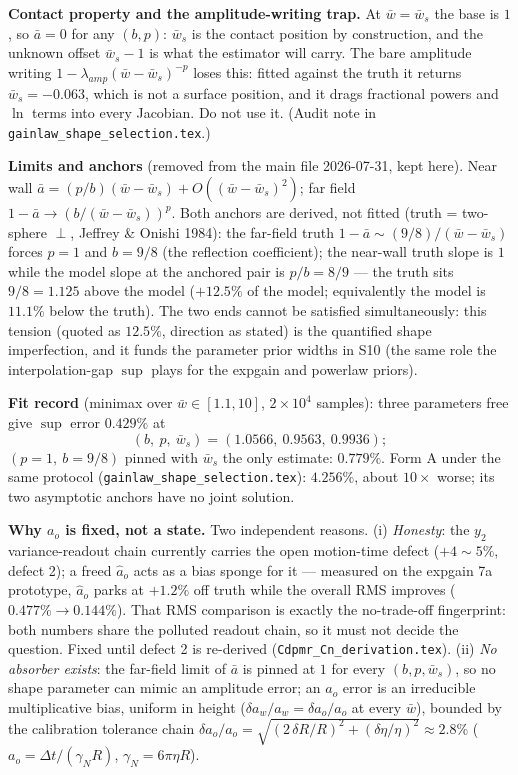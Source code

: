 \documentclass[11pt,a4paper,fontset=none]{ctexart}
\begin{document}
\textbf{Contact property and the amplitude-writing trap.}  At
$\bar{w}=\bar{w}_s$ the base is $1$, so $\bar{a}=0$ for any $(b,p)$:
$\bar{w}_s$ is the contact position by construction, and the unknown offset
$\bar{w}_s-1$ is what the estimator will carry.  The bare amplitude writing
$1-\lambda_{amp}(\bar{w}-\bar{w}_s)^{-p}$ loses this: fitted against the
truth it returns $\bar{w}_s=-0.063$, which is not a surface position, and it
drags fractional powers and $\ln$ terms into every Jacobian.  Do not use it.
(Audit note in \texttt{gainlaw\_shape\_selection.tex}.)

\textbf{Limits and anchors} (removed from the main file 2026-07-31, kept
here).  Near wall $\bar{a} = (p/b)(\bar{w}-\bar{w}_s) +
O((\bar{w}-\bar{w}_s)^2)$; far field $1-\bar{a} \to
(b/(\bar{w}-\bar{w}_s))^{p}$.  Both anchors are derived, not fitted
(truth = two-sphere $\perp$, Jeffrey \& Onishi 1984): the far-field truth
$1-\bar{a}\sim(9/8)/(\bar{w}-\bar{w}_s)$ forces $p=1$ and $b=9/8$ (the
reflection coefficient); the near-wall truth slope is $1$ while the model
slope at the anchored pair is $p/b = 8/9$ --- the truth sits $9/8 = 1.125$
above the model ($+12.5\%$ of the model; equivalently the model is
$11.1\%$ below the truth).  The two ends cannot be satisfied
simultaneously: this tension (quoted as $12.5\%$, direction as stated) is
the quantified shape imperfection, and it funds the parameter prior
widths in S10 (the same role the interpolation-gap $\sup$ plays for the
expgain and powerlaw priors).

\textbf{Fit record} (minimax over $\bar{w}\in[1.1,10]$, $2\times10^4$
samples): three parameters free give $\sup$ error $0.429\%$ at
\begin{equation*}
(b,\ p,\ \bar{w}_s) = (1.0566,\ 0.9563,\ 0.9936);
\end{equation*}
$(p{=}1,\ b{=}9/8)$ pinned with $\bar{w}_s$ the only estimate: $0.779\%$.
Form A under the same protocol
(\texttt{gainlaw\_shape\_selection.tex}): $4.256\%$, about $10\times$
worse; its two asymptotic anchors have no joint solution.

\textbf{Why $a_o$ is fixed, not a state.}  Two independent reasons.
(i) \emph{Honesty}: the $y_2$ variance-readout chain currently carries the
open motion-time defect ($+4\sim5\%$, defect 2); a freed $\hat{a}_o$ acts as
a bias sponge for it --- measured on the expgain 7a prototype, $\hat{a}_o$
parks at $+1.2\%$ off truth while the overall RMS improves
($0.477\%\to0.144\%$).  That RMS comparison is exactly the no-trade-off
fingerprint: both numbers share the polluted readout chain, so it must not
decide the question.  Fixed until defect 2 is re-derived
(\texttt{Cdpmr\_Cn\_derivation.tex}).
(ii) \emph{No absorber exists}: the far-field limit of $\bar{a}$ is pinned at
$1$ for every $(b,p,\bar{w}_s)$, so no shape parameter can mimic an amplitude
error; an $a_o$ error is an irreducible multiplicative bias, uniform in
height ($\delta a_w/a_w = \delta a_o/a_o$ at every $\bar{w}$), bounded by
the calibration tolerance chain
$\delta a_o/a_o=\sqrt{(2\,\delta R/R)^2+(\delta\eta/\eta)^2}\approx 2.8\%$
($a_o = \Delta t/(\gamma_N R)$, $\gamma_N = 6\pi\eta R$).
\end{document}
